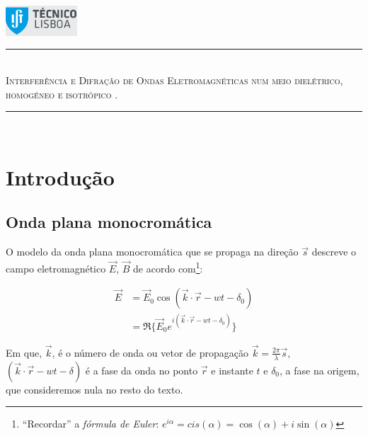 \documentclass[a4paper,12pt]{article}
\author{Prof. Bernardo B. Carvalho}
\date{ Outubro 2012}
\newcommand{\HRule}{\rule{\linewidth}{0.5mm}}
\begin{document}
 

	\includegraphics[width=0.2\textwidth]{../logo-ist}%

	\HRule \\[0.5cm]
	{ \huge \sf  \textsc{Interferência e Difração de Ondas Eletromagnéticas num meio dielétrico, homogéneo e isotrópico .}} \\[0.4cm] %
	\HRule \\%





\section{\sf Introdução}
\subsection{\sf Onda plana monocromática }

O modelo da onda plana monocromática que se propaga na direção $\vec{s}$ descreve o campo  eletromagnético $\vec{E}$, $\vec{B}$ de acordo com\footnote{``Recordar''  a \emph{fórmula de Euler}: $e^{i \alpha} = cis(\alpha) = \cos(\alpha) + i \sin(\alpha)$}:

\begin{align}
	\vec{E} &= \vec{E}_0 \cos(\vec{k} \cdot \vec{r} -wt -\delta_0) \label{eq:1}\\
	&= \Re \{\vec{E}_0 e^{ i (\vec{k} \cdot \vec{r} -wt - \delta_0)}\} 
\end{align}

Em que, $\vec{k}$, é o número de onda ou vetor de propagação $\vec{k} =\frac{2 \pi}{\lambda}   \vec{s} $, $(\vec{k} \cdot \vec{r} -wt -\delta)$ é a fase da onda no ponto $\vec{r}$ e instante $t$ e 
$\delta_0$, a fase na origem,  que consideremos nula no resto do texto.
\end{document}
